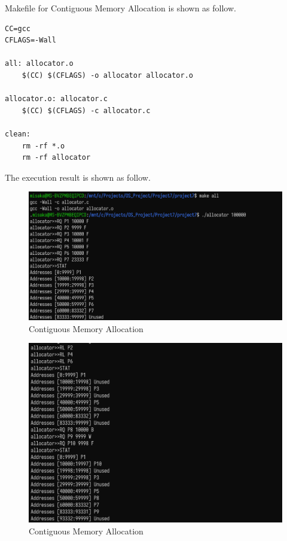 \documentclass[UTF8,10pt,a4paper]{article}
\theoremstyle{Problem}
\theoremstyle{Solution}
\begin{document}
Makefile for Contiguous Memory Allocation is shown as follow.
\begin{lstlisting}
CC=gcc
CFLAGS=-Wall

all: allocator.o
	$(CC) $(CFLAGS) -o allocator allocator.o

allocator.o: allocator.c
	$(CC) $(CFLAGS) -c allocator.c

clean:
	rm -rf *.o
	rm -rf allocator
\end{lstlisting}



The execution result is shown as follow.

\begin{figure}[H]
    \centering
    \includegraphics[width=400pt]{1.png}
    \caption{Contiguous Memory Allocation}
    \label{3}
\end{figure}


\begin{figure}[H]
    \centering
    \includegraphics[width=400pt]{2.png}
    \caption{Contiguous Memory Allocation}
    \label{3}
\end{figure}
\end{document}
